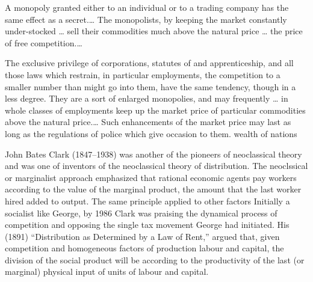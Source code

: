 {\color{red}


A monopoly granted either to an individual or to a trading company has the same effect as a secret.… The monopolists, by keeping the market constantly under-stocked … sell their commodities much above the natural price … the price of free competition.…

The exclusive privilege of corporations, statutes of and apprenticeship, and all those laws which restrain, in particular employments, the competition to a smaller number than might go into them, have the same tendency, though in a less degree. They are a sort of enlarged monopolies, and may frequently … in whole classes of employments keep up the market price of particular commodities above the natural price.… Such enhancements of the market price may last as long as the regulations of police which give occasion to them. wealth of nations
}


John Bates Clark (1847--1938) was another of the pioneers of neoclassical theory and was one of inventors of the neoclassical theory of  distribution.  The neoclssical or marginalist approach emphasized that rational economic agents pay workers according to the value of the marginal product, the amount that the last worker hired added to output. %
 The same principle applied to other factors  
 Initially a socialist like George,   %
 by 1986 Clark was praising the dynamical process of competition and opposing the single tax movement George had initiated.  His (1891) ``Distribution as Determined by a Law of Rent,''\cite{clarkDistributionDeterminedLaw1891} argued that, given  competition and homogeneous factors of production labour and capital, the division of the social product will be according to the productivity of the last (or marginal) physical input of units of labour and capital.

